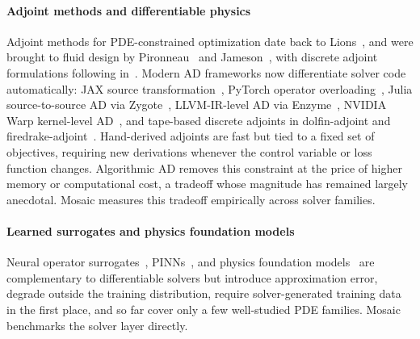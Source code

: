 \paragraph{Adjoint methods and differentiable physics}
Adjoint methods for PDE-constrained optimization date back to
Lions~\cite{lions1971optimal}, and were brought to fluid design by
Pironneau~\cite{pironneau1974optimum} and
Jameson~\cite{jameson1988aerodynamic}, with discrete adjoint
formulations following in~\cite{giles2000introduction,nadarajah2000studies}.
Modern AD frameworks now differentiate solver code automatically:
JAX source transformation~\cite{bradbury2018jax}, PyTorch operator
overloading~\cite{paszke2019pytorch}, Julia source-to-source AD via
Zygote~\cite{innes2018don}, LLVM-IR-level AD via
Enzyme~\cite{moses2020enzyme}, NVIDIA
Warp kernel-level AD~\cite{macklin2024warp}, and tape-based discrete
adjoints in dolfin-adjoint and
firedrake-adjoint~\cite{farrell2013automated,mitusch2019dolfinadjoint}.
Hand-derived adjoints are fast but tied to a fixed set of objectives,
requiring new derivations whenever the control variable or loss function
changes. Algorithmic AD removes this constraint at the price of higher
memory or computational cost, a tradeoff whose magnitude has remained
largely anecdotal. Mosaic measures this tradeoff empirically across solver families.

\paragraph{Learned surrogates and physics foundation models}
Neural operator surrogates~\cite{kovachki2023neural,li2021fourier,lu2021learning},
PINNs~\cite{raissi2019physics}, and physics foundation
models~\cite{pathak2022fourcastnet,bodnar2024aurora,price2024gencast,hao2024dpot,herde2024poseidon}
are complementary to differentiable solvers but introduce approximation
error, degrade outside the training distribution, require solver-generated
training data in the first place, and so far cover only a few well-studied
PDE families. Mosaic benchmarks the solver layer directly.

